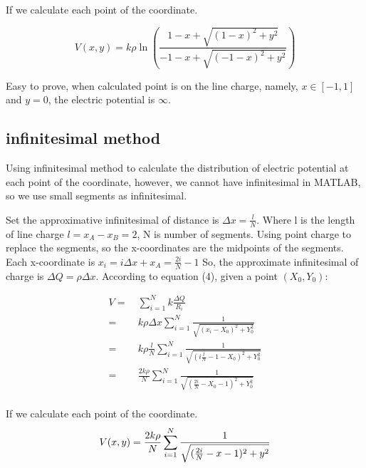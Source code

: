\documentclass[10pt, journal, final]{IEEEtran}
\begin{document}
If we calculate each point of the coordinate.

\begin{equation}
    V(x,y)=k\rho\ln{\left(
        \frac{1-x+\sqrt{(1-x)^2+y^2}}{-1-x+\sqrt{(-1-x)^2+y^2}}
        \right)}
\end{equation}

Easy to prove, when calculated point is on the line charge, namely, $x\in[-1,1]$ and $y = 0$,
the electric potential is $\infty$.

\subsection{
    infinitesimal method
}\label{
    method:infinitesimal
}

Using infinitesimal method to calculate the distribution of electric potential
at each point of the coordinate, however, we cannot have infinitesimal in MATLAB,
so we use small segments as infinitesimal.\par
Set the approximative infinitesimal of distance is $\Delta x = \frac{l}{N}$.
Where l is the length of line charge $l = x_A - x_B = 2$, N is number of segments.
Using point charge to replace the segments, 
so the x-coordinates are the midpoints of the segments.
Each x-coordinate is $x_i = i\Delta x + x_A = \frac{2i}{N} - 1$
So, the approximate infinitesimal of charge is $\Delta Q = \rho \Delta x$.
According to equation (4), given a point $(X_0, Y_0)$:

\begin{equation}
    \begin{aligned}
        V = & \ \sum_{i=1}^N k\frac{\Delta Q}{R_i}                                              \\
        =   & \ k\rho \Delta x\sum_{i=1}^N \frac{1}{\sqrt{(x_i - X_0)^2+Y_0^2}}                 \\
        =   & \ k\rho \frac{l}{N}\sum_{i=1}^N \frac{1}{\sqrt{(i\frac{l}{N} - 1 - X_0)^2+Y_0^2}} \\
        =   & \ \frac{2k\rho}{N}
        \sum_{i=1}^N \frac{1}{\sqrt{(\frac{2i}{N} - X_0 - 1)^2+Y_0^2}}                          \\
    \end{aligned}
\end{equation}

If we calculate each point of the coordinate.
\begin{equation}
    V(x,y) = \frac{2k\rho}{N}\sum_{i=1}^N \frac{1}{\sqrt{(\frac{2i}{N} - x - 1)^2+y^2}} \\
\end{equation}
\end{document}
